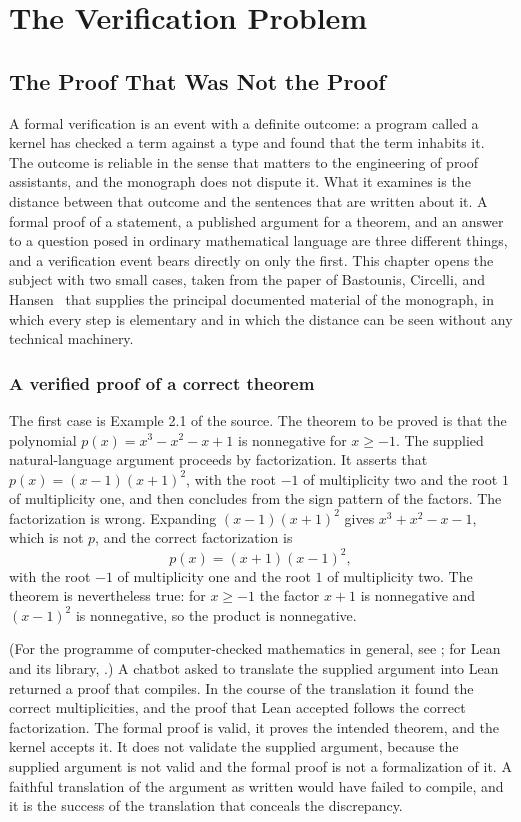 \part{The Verification Problem}

\chapter{The Proof That Was Not the Proof}
\label{ch:proofnot}

A formal verification is an event with a definite outcome: a program called a kernel has checked a term against a type and found that the term inhabits it. The outcome is reliable in the sense that matters to the engineering of proof assistants, and the monograph does not dispute it. What it examines is the distance between that outcome and the sentences that are written about it. A formal proof of a statement, a published argument for a theorem, and an answer to a question posed in ordinary mathematical language are three different things, and a verification event bears directly on only the first. This chapter opens the subject with two small cases, taken from the paper of Bastounis, Circelli, and Hansen~\cite{BCH26} that supplies the principal documented material of the monograph, in which every step is elementary and in which the distance can be seen without any technical machinery.

\section{A verified proof of a correct theorem}

The first case is Example 2.1 of the source. The theorem to be proved is that the polynomial $p(x) = x^3 - x^2 - x + 1$ is nonnegative for $x \ge -1$. The supplied natural-language argument proceeds by factorization. It asserts that $p(x) = (x-1)(x+1)^2$, with the root $-1$ of multiplicity two and the root $1$ of multiplicity one, and then concludes from the sign pattern of the factors. The factorization is wrong. Expanding $(x-1)(x+1)^2$ gives $x^3 + x^2 - x - 1$, which is not $p$, and the correct factorization is
\[
p(x) = (x+1)(x-1)^2,
\]
with the root $-1$ of multiplicity one and the root $1$ of multiplicity two. The theorem is nevertheless true: for $x \ge -1$ the factor $x+1$ is nonnegative and $(x-1)^2$ is nonnegative, so the product is nonnegative.

(For the programme of computer-checked mathematics in general, see \cite{Barendregt05}; for Lean and its library, \cite{Lean4,LeanMathlib20}.) A chatbot asked to translate the supplied argument into Lean returned a proof that compiles. In the course of the translation it found the correct multiplicities, and the proof that Lean accepted follows the correct factorization. The formal proof is valid, it proves the intended theorem, and the kernel accepts it. It does not validate the supplied argument, because the supplied argument is not valid and the formal proof is not a formalization of it. A faithful translation of the argument as written would have failed to compile, and it is the success of the translation that conceals the discrepancy.

